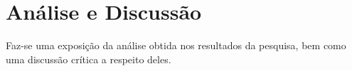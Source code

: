 \chapter{Análise e Discussão}

	Faz-se uma exposição da análise obtida nos resultados da pesquisa, bem como uma discussão crítica a respeito deles.